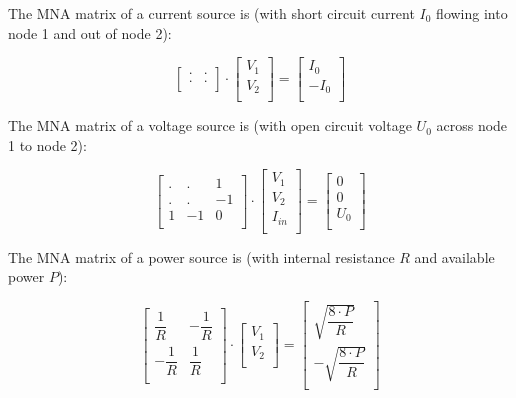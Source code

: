The MNA matrix of a current source is (with short circuit current $I_0$
flowing into node 1 and out of node 2):

\begin{equation}
\begin{bmatrix}
.&.\\
.&.\\
\end{bmatrix}
\cdot
\begin{bmatrix}
V_{1}\\
V_{2}\\
\end{bmatrix}
=
\begin{bmatrix}
 I_0\\
-I_0\\
\end{bmatrix}
\end{equation}

The MNA matrix of a voltage source is (with open circuit voltage $U_0$
across node 1 to node 2):

\begin{equation}
\begin{bmatrix}
.& .& 1\\
.& .&-1\\
1&-1& 0\\
\end{bmatrix}
\cdot
\begin{bmatrix}
V_{1}\\
V_{2}\\
I_{in}\\
\end{bmatrix}
=
\begin{bmatrix}
 0\\
 0\\
 U_0\\
\end{bmatrix}
\end{equation}

The MNA matrix of a power source is (with internal resistance $R$
and available power $P$):

\begin{equation}
\begin{bmatrix}
 \dfrac{1}{R} & -\dfrac{1}{R} \\
-\dfrac{1}{R} &  \dfrac{1}{R} \\
\end{bmatrix}
\cdot
\begin{bmatrix}
V_{1}\\
V_{2}\\
\end{bmatrix}
=
\begin{bmatrix}
 \sqrt{\dfrac{8\cdot P}{R}}\\
-\sqrt{\dfrac{8\cdot P}{R}}\\
\end{bmatrix}
\end{equation}

